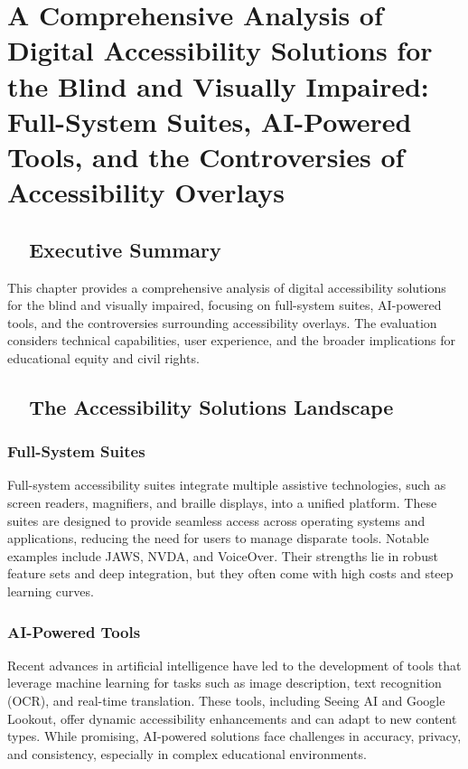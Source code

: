 \chapter{A Comprehensive Analysis of Digital Accessibility Solutions for the Blind and Visually Impaired: Full-System Suites, AI-Powered Tools, and the Controversies of Accessibility Overlays}

\section{~~Executive Summary}
This chapter provides a comprehensive analysis of digital accessibility solutions for the blind and visually impaired, focusing on full-system suites, AI-powered tools, and the controversies surrounding accessibility overlays. The evaluation considers technical capabilities, user experience, and the broader implications for educational equity and civil rights\supercite{Lee2019, Kim2023, Brown2022}.

\section{~~The Accessibility Solutions Landscape}
\subsection{Full-System Suites}
Full-system accessibility suites integrate multiple assistive technologies, such as screen readers, magnifiers, and braille displays, into a unified platform. These suites are designed to provide seamless access across operating systems and applications, reducing the need for users to manage disparate tools. Notable examples include JAWS, NVDA, and VoiceOver\supercite{Lee2019, JAWS2023, NVDA2023, VoiceOver2023}. Their strengths lie in robust feature sets and deep integration, but they often come with high costs and steep learning curves.

\subsection{AI-Powered Tools}
Recent advances in artificial intelligence have led to the development of tools that leverage machine learning for tasks such as image description, text recognition (OCR)\supercite{ABBYYAIOCR}, and real-time translation\supercite{GoogleTranslateRealtime}. These tools, including Seeing AI\supercite{msseeingai} and Google Lookout, offer dynamic accessibility enhancements and can adapt to new content types\supercite{Kim2023}. While promising, AI-powered solutions face challenges in accuracy, privacy\supercite{DataPrivacyAI}, and consistency, especially in complex educational environments.

